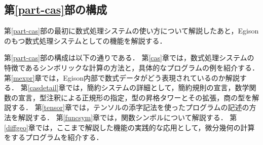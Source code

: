
\subsection{第\ref{part-cas}部の構成}

第\ref{part-cas}部の最初に数式処理システムの使い方について解説したあと，Egisonのもつ数式処理システムとしての機能を解説する．

第\ref{part-cas}部の構成は以下の通りである．
第\ref{cas}章では，数式処理システムの特徴であるシンボリックな計算の方法と，具体的なプログラムの例を紹介する．
第\ref{mexpr}章では，Egison内部で数式データがどう表現されているのか解説する．
第\ref{casdetail}章では，簡約システムの詳細として，簡約規則の宣言，数学関数の宣言，型注釈による正規形の指定，型の昇格タワーとその拡張，商の型を解説する．
第\ref{tensor}章では，テンソルの添字記法を使ったプログラムの記述の方法を解説する．
第\ref{funcsym}章では，関数シンボルについて解説する．
第\ref{diffgeo}章では，ここまで解説した機能の実践的な応用として，微分幾何の計算をするプログラムを紹介する．

